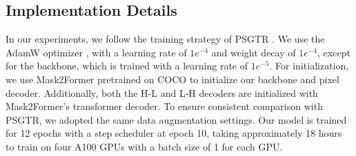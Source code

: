\subsection{Implementation Details}
In our experiments, we follow the training strategy of PSGTR \citep{yang2022panoptic}.
We use the AdamW optimizer \citep{loshchilov2017decoupled}, with a learning rate of $1e^{-4}$ and weight decay of $1e^{-4}$, except for the backbone, which is trained with a learning rate of $1e^{-5}$. For initialization, we use Mask2Former \citep{cheng2022masked} pretrained on COCO \citep{lin2014microsoft} to initialize our backbone and pixel decoder.
Additionally, both the H-L and L-H decoders are initialized with Mask2Former's transformer decoder.
To ensure consistent comparison with PSGTR, we adopted the same data augmentation settings.
Our model is trained for 12 epochs with a step scheduler at epoch 10, taking approximately 18 hours to train on four A100 GPUs with a batch size of 1 for each GPU.



\begin{table}[t]
\centering
\setlength{\tabcolsep}{7pt}
\caption{Comparison between our HiLo and other methods on the PSG dataset.
Our method shows superior performance compared to all previous methods.
}
\label{hilo:tab:psg_main_results}
\end{table}




